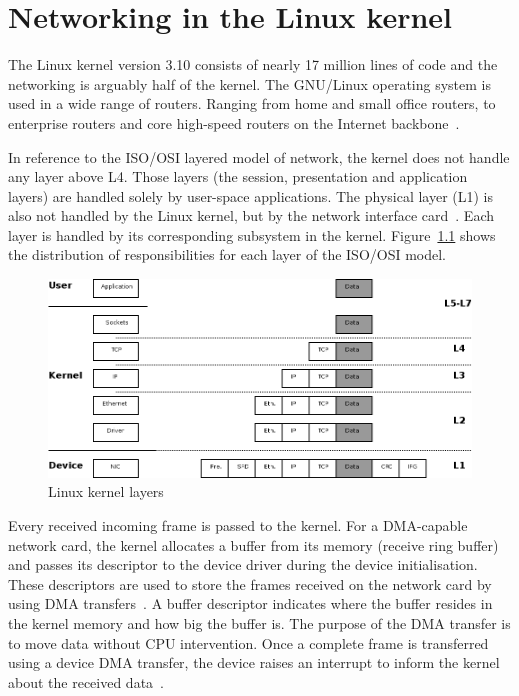 
\chapter{Networking in the Linux kernel}\label{chap:linux}
The Linux kernel version 3.10 consists of nearly 17 million lines of code
and the networking is arguably half of the kernel.
The GNU/Linux operating system is used in a wide range of routers.
Ranging from home and small office routers, to enterprise routers and
core high-speed routers on the Internet backbone~\cite{linux-by-numbers}.

In reference to the ISO/OSI layered model of network,
the kernel does not handle any layer above L4.
Those layers (the session, presentation and application layers) are
handled solely by user-space applications.
The physical layer (L1) is also not handled by the Linux kernel,
but by the network interface card~\cite{linux-kernel-networking}.
Each layer is handled by its corresponding subsystem in the kernel.
Figure~\ref{fig:linux-layers} shows the distribution of responsibilities for each layer of the ISO/OSI model.

\begin{figure}[H]
	\bigskip
	\centering
	\includegraphics[width=14cm,keepaspectratio]{fig/layers.png}
	\caption{Linux kernel layers}
	\label{fig:linux-layers}
	\bigskip
\end{figure}

Every received incoming frame is passed to the kernel.
For a DMA-capable network card, the kernel allocates a buffer from its memory (receive ring buffer) and passes its descriptor to the
device driver during the device initialisation.
These descriptors are used to store the frames received on the network card by using DMA transfers~\cite{tcpip-in-linux}.
A buffer descriptor indicates where the buffer resides in the kernel memory and how big the buffer is.
The purpose of the DMA transfer is to move data without CPU intervention.
Once a complete frame is transferred using a device DMA transfer,
the device raises an interrupt to inform the kernel about the received data~\cite{tcpip-in-linux}.

